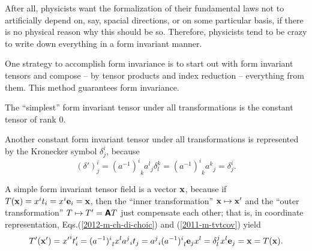 After all, physicists want the formalization of their fundamental laws not to artificially depend on,
say, spacial directions, or on some particular basis, if there is no physical reason why this should be so.
Therefore, physicists tend to be crazy to write down everything in a
form invariant manner.

One strategy to accomplish  form invariance  is to start out with form invariant
tensors and compose -- by tensor products and index reduction -- everything from them. This method guarantees form
invariance.

{
\color{blue}
\bexample

The ``simplest'' form invariant tensor under all transformations is the constant tensor of rank $0$.

Another constant form invariant tensor  under all transformations is represented by the Kronecker symbol $\delta^i_j$,
because
\begin{equation}
{(\delta ')}^i_j= {(a^{-1})^i}_{k} {a^{l}}_j\delta^{k}_{l}={(a^{-1})^i}_{k} {a^{k}}_j= \delta^i_j
.
\end{equation}

A simple form invariant tensor field is a vector ${\bf x}$,
because if $T({\bf x})= x^i t_i= x^i {\bf e}_i={\bf x}$, then
the ``inner transformation''
${\bf x} \mapsto  {\bf x}'$
and the ``outer transformation''
$T \mapsto  T'= \textsf{\textbf{A}}T$
just compensate each other; that is, in coordinate representation, Eqs.(\ref{2012-m-ch-di-choic}) and (\ref{2011-m-tvtcov}) yield
\begin{equation}
T'({\bf x}')= {x'}^i t'_i= {(a^{-1})^i}_l x^l   {a^j}_i t_j = {a^j}_i {(a^{-1})^i}_l  {\bf e}_j  x^l
= \delta_l^j x^l {\bf e}_j  = {\bf x} = T({\bf x}).
\end{equation}



}
